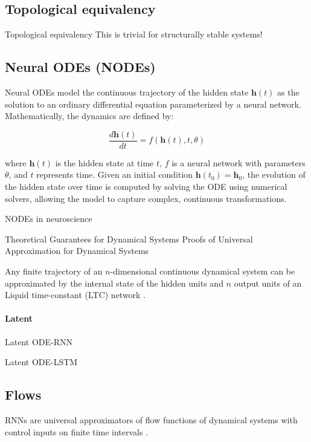 \documentclass{article}
\theoremstyle{definition}
\theoremstyle{remark}
\begin{document}
\subsection{Topological equivalency}
Topological equivalency \citep{hart2020recurrent}
This is trivial for structurally stable systems!


\subsection{Neural ODEs (NODEs)}
Neural ODEs\citep{chen2018neural} model the continuous trajectory of the hidden state \( \mathbf{h}(t) \) as the solution to an ordinary differential equation parameterized by a neural network. Mathematically, the dynamics are defined by:

\[
\frac{d \mathbf{h}(t)}{dt} = f(\mathbf{h}(t), t, \theta)
\]

where \( \mathbf{h}(t) \) is the hidden state at time \( t \), \( f \) is a neural network with parameters \( \theta \), and \( t \) represents time. Given an initial condition \( \mathbf{h}(t_0) = \mathbf{h}_0 \), the evolution of the hidden state over time is computed by solving the ODE using numerical solvers, allowing the model to capture complex, continuous transformations.


NODEs in neuroscience\citep{kim2021inferring, sedler2023expressive}




Theoretical Guarantees for Dynamical Systems
 Proofs of Universal Approximation for Dynamical Systems
 
 
 Any finite trajectory of an $n$-dimensional continuous dynamical system can be approximated by the internal state of the hidden units and $n$ output units of an Liquid time-constant (LTC) network \citep{hasani2018liquid}.
 
 
\citep{tabuada2020universal}



\paragraph{Latent}
Latent ODE-RNN\citep{rubanova2019latent}

Latent ODE-LSTM \citep{coelho2024enhancing}


\subsection{Flows}
RNNs are universal approximators of flow  functions of dynamical systems  with control inputs on finite time intervals  \citep{aguiar2023}.
\end{document}
